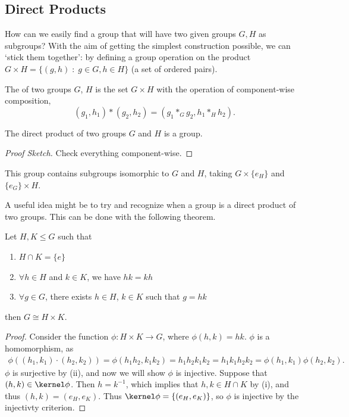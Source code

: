 \documentclass[a4]{scrreprt}
\begin{document}
\subsection{Direct Products}

How can we easily find a group that will have two given groups $G, H$ as subgroups?
With the aim of getting the simplest construction possible, we can `stick them together': by defining a group operation on the product $G \times H = \{ (g, h)  \; : \; g \in G, h \in H\}$ (a set of ordered pairs).

\begin{definition}
	The  of two groups $G$, $H$ is the set $G \times H$ with the operation of component-wise composition,
	$$
	(g_1, h_1) * (g_2, h_2) = (g_1 *_G g_2, h_1 *_H h_2).
	$$
\end{definition}

\begin{proposition}
	The direct product of two groups $G$ and $H$ is a group.
\end{proposition}
\begin{proof}[Proof Sketch]
	Check everything component-wise.
\end{proof}

This group contains subgroups isomorphic to $G$ and $H$, taking $G \times \{ e_H \}$ and $\{ e_G \} \times H$.

A useful idea might be to try and recognize when a group is a direct product of two groups. This can be done with the following theorem.

\begin{theorem}
	Let $H, K \leq G$ such that
	\begin{enumerate}[label=(\roman*)]
		\item $H \cap K = \{e\}$
		\item $\forall h \in H$ and $k \in K$, we have $hk = kh$
		\item $\forall g \in G$, there exists $h \in H$, $k \in K$ such that $g = hk$
	\end{enumerate}
	then $G \cong H \times K$.
\end{theorem}
% 
\begin{proof}
	Consider the function $\phi : H \times K \rightarrow G$, where $\phi(h, k) = hk$.
	$\phi$ is a homomorphism, as
	\begin{align*}
		\phi((h_1, k_1) \cdot (h_2, k_2)) = \phi(h_1 h_2, k_1 k_2) = h_1 h_2 k_1 k_2 = h_1 k_1 h_2 k_2 = \phi(h_1, k_1) \phi(h_2, k_2).
	\end{align*}
	$\phi$ is surjective by (ii), and now we will show $\phi$ is injective.
	Suppose that $(h, k) \in \kernel\phi$. Then $h = k^{-1}$, which implies that $h, k \in H \cap K$ by (i), and thus $(h, k) = (e_H, e_K)$. Thus $\kernel \phi = \{(e_H, e_K)\}$, so $\phi$ is injective by the injectivty criterion.
\end{proof}
\end{document}
